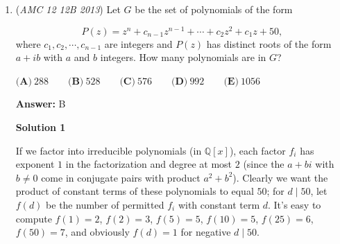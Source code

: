 \begin{enumerate}
 Hence, $3 - 2a + \frac{m^{2}}{a} = 1 - m^{2} - \frac{3m^{2}}{a} \implies 2a - 2 = \frac{4m^{2}}{a} + m^{2}$ 

 From this new equation we can solve for $m^{2}$ to get:

 $m^{2} = \frac{2a - 2}{\frac{4}{a} + 1}$

 From equation (2), we can also solve for $m^{2}$ to get:

 $m^{2} = \frac{1}{1 + \frac{3}{a} + \frac{3}{a^{2}}}$

 Hence:

 $\frac{2a - 2}{\frac{4}{a} + 1} = \frac{1}{1 + \frac{3}{a} + \frac{3}{a^{2}}}$

 We can clear fractions and cross multiply to get:

 $(2a^{2} - 2a)(a^{2} + 3a + 3) = a^{2}(a + 4) \implies (2a - 2)(a^{2} + 3a + 3) = a(a + 4) = a^{2} + 4a$

 Hence:

 $2a^{3} + 4a^{2} - 6 = a^{2} + 4a \implies 2a^{3} + 3a^{2} - 4a - 6 = 0$

 Magnificently, we can factor this! We get:

 $(a^{2} - 2)(2a + 3) = 0$ following factoring by grouping

 Now, it's clear $a = \pm \sqrt{2}, -\frac{3}{2}$ Since $a$ is a side length, only $a = \sqrt{2}$ makes sense. Remember, the problem asked for $m^{2} = \frac{2a - 2}{\frac{4}{a} + 1} = \frac{2\sqrt{2} - 2}{2\sqrt{2} + 1} = \frac{10 - 6\sqrt{2}}{7}$ so our answer is $(A)$. 

 


	\item (\textit{AMC 12 12B 2013}) Let $G$ be the set of polynomials of the form

 \[P(z)=z^n+c_{n-1}z^{n-1}+\cdots+c_2z^2+c_1z+50,\]
where $c_1,c_2,\cdots, c_{n-1}$ are integers and $P(z)$ has distinct roots of the form $a+ib$ with $a$ and $b$ integers. How many polynomials are in $G$?


 $\textbf{(A)}\ 288\qquad\textbf{(B)}\ 528\qquad\textbf{(C)}\ 576\qquad\textbf{(D)}\ 992\qquad\textbf{(E)}\ 1056$

 \textbf{Answer: }B



\textbf{Solution 1}

If we factor into irreducible polynomials (in $\mathbb{Q}[x]$), each factor $f_i$ has exponent $1$ in the factorization and degree at most $2$ (since the $a+bi$ with $b\ne0$ come in conjugate pairs with product $a^2+b^2$). Clearly we want the product of constant terms of these polynomials to equal $50$; for $d\mid 50$, let $f(d)$ be the number of permitted $f_i$ with constant term $d$. It's easy to compute $f(1)=2$, $f(2)=3$, $f(5)=5$, $f(10)=5$, $f(25)=6$, $f(50)=7$, and obviously $f(d) = 1$ for negative $d\mid 50$.


\end{enumerate}
